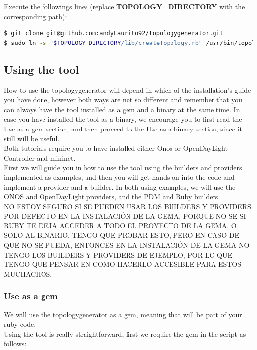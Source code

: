 Execute the followings lines (replace \textbf{TOPOLOGY\_DIRECTORY} with the corresponding path):

\begin{lstlisting}[language=bash,breaklines=true]
$ git clone git@github.com:andyLaurito92/topologygenerator.git
$ sudo ln -s "$TOPOLOGY_DIRECTORY/lib/createTopology.rb" /usr/bin/topologygenerator
\end{lstlisting}

\subsection{Using the tool}

How to use the topologygenerator will depend in which of the installation's guide you have done, however both ways are not so different and remember that you can always have the tool installed as a gem and a binary at the same time. In case you have installed the tool as a binary, we encourage you to first read the Use as a gem section, and then proceed to the Use as a binary section, since it still will be useful. \\
Both tutorials require you to have installed either Onos or OpenDayLight Controller and mininet. \\
First we will guide you in how to use the tool using the builders and providers implemented as examples, and then you will get hands on into the code and implement a provider and a builder. In both using examples, we will use the ONOS and OpenDayLight providers, and the PDM and Ruby builders. \\

NO ESTOY SEGURO SI SE PUEDEN USAR LOS BUILDERS Y PROVIDERS POR DEFECTO EN LA INSTALACIÓN DE LA GEMA, PORQUE NO SE SI RUBY TE DEJA ACCEDER A TODO EL PROYECTO DE LA GEMA, O SOLO AL BINARIO. TENGO QUE PROBAR ESTO, PERO EN CASO DE QUE NO SE PUEDA, ENTONCES EN LA INSTALACIÓN DE LA GEMA NO TENGO LOS BUILDERS Y PROVIDERS DE EJEMPLO, POR LO QUE TENGO QUE PENSAR EN COMO HACERLO ACCESIBLE PARA ESTOS MUCHACHOS.

\subsubsection{Use as a gem}

We will use the topologygenerator as a gem, meaning that will be part of your ruby code. \\
Using the tool is really straightforward, first we require the gem in the script as follows:

